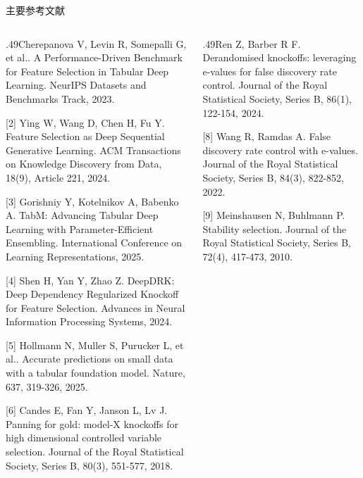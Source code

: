 \documentclass[aspectratio=169]{beamer}
\begin{document}
\begin{frame}{主要参考文献}
\begin{columns}[T]\begin{column}{.49\textwidth}\fontsize{6}{7.4}\selectfont[1] Cherepanova V, Levin R, Somepalli G, et al.. A Performance-Driven Benchmark for Feature Selection in Tabular Deep Learning. NeurIPS Datasets and Benchmarks Track, 2023.\par\vspace{0.4em}
[2] Ying W, Wang D, Chen H, Fu Y. Feature Selection as Deep Sequential Generative Learning. ACM Transactions on Knowledge Discovery from Data, 18(9), Article 221, 2024.\par\vspace{0.4em}
[3] Gorishniy Y, Kotelnikov A, Babenko A. TabM: Advancing Tabular Deep Learning with Parameter-Efficient Ensembling. International Conference on Learning Representations, 2025.\par\vspace{0.4em}
[4] Shen H, Yan Y, Zhao Z. DeepDRK: Deep Dependency Regularized Knockoff for Feature Selection. Advances in Neural Information Processing Systems, 2024.\par\vspace{0.4em}
[5] Hollmann N, Muller S, Purucker L, et al.. Accurate predictions on small data with a tabular foundation model. Nature, 637, 319-326, 2025.\par\vspace{0.4em}
[6] Candes E, Fan Y, Janson L, Lv J. Panning for gold: model-X knockoffs for high dimensional controlled variable selection. Journal of the Royal Statistical Society, Series B, 80(3), 551-577, 2018.\par\vspace{0.4em}
\end{column}\begin{column}{.49\textwidth}\fontsize{6}{7.4}\selectfont[7] Ren Z, Barber R F. Derandomised knockoffs: leveraging e-values for false discovery rate control. Journal of the Royal Statistical Society, Series B, 86(1), 122-154, 2024.\par\vspace{0.4em}
[8] Wang R, Ramdas A. False discovery rate control with e-values. Journal of the Royal Statistical Society, Series B, 84(3), 822-852, 2022.\par\vspace{0.4em}
[9] Meinshausen N, Buhlmann P. Stability selection. Journal of the Royal Statistical Society, Series B, 72(4), 417-473, 2010.\par\vspace{0.4em}

\end{column}
\end{columns}
\end{frame}
\end{document}
